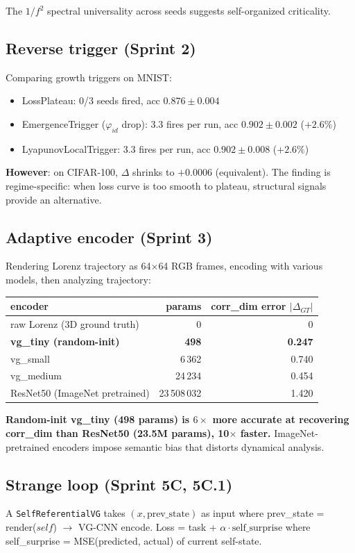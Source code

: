 \documentclass[11pt]{article}
\begin{document}
The $1/f^2$ spectral universality across seeds suggests self-organized criticality.

\subsection{Reverse trigger (Sprint 2)}
Comparing growth triggers on MNIST:
\begin{itemize}
    \item LossPlateau: 0/3 seeds fired, acc $0.876 \pm 0.004$
    \item EmergenceTrigger ($\varphi_{id}$ drop): 3.3 fires per run, acc $\mathbf{0.902 \pm 0.002}$ ($+2.6\%$)
    \item LyapunovLocalTrigger: 3.3 fires per run, acc $0.902 \pm 0.008$ ($+2.6\%$)
\end{itemize}

\textbf{However}: on CIFAR-100, $\Delta$ shrinks to $+0.0006$ (equivalent). The finding is regime-specific: when loss curve is too smooth to plateau, structural signals provide an alternative.

\subsection{Adaptive encoder (Sprint 3)}
Rendering Lorenz trajectory as 64$\times$64 RGB frames, encoding with various models, then analyzing trajectory:

\begin{table}[h]
\centering\small
\begin{tabular}{lrr}
\toprule
encoder & params & corr\_dim error $|$$\Delta_{GT}$$|$ \\
\midrule
raw Lorenz (3D ground truth) & 0 & 0 \\
\textbf{vg\_tiny (random-init)} & \textbf{498} & \textbf{0.247} \\
vg\_small & 6\,362 & 0.740 \\
vg\_medium & 24\,234 & 0.454 \\
ResNet50 (ImageNet pretrained) & 23\,508\,032 & 1.420 \\
\bottomrule
\end{tabular}
\end{table}

\textbf{Random-init vg\_tiny (498 params) is $6\times$ more accurate at recovering corr\_dim than ResNet50 (23.5M params), 10$\times$ faster.} ImageNet-pretrained encoders impose semantic bias that distorts dynamical analysis.

\subsection{Strange loop (Sprint 5C, 5C.1)}
A \texttt{SelfReferentialVG} takes $(x, \text{prev\_state})$ as input where prev\_state = render($\textit{self}$) $\to$ VG-CNN encode. Loss = task + $\alpha \cdot \text{self\_surprise}$ where self\_surprise = MSE(predicted, actual) of current self-state.
\end{document}

